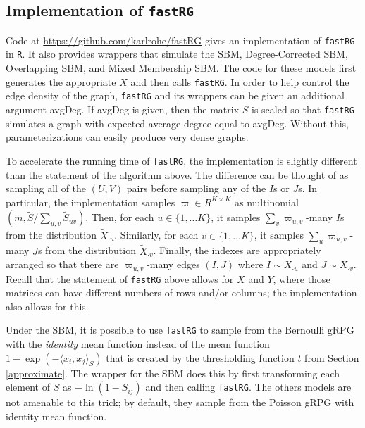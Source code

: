 \documentclass[twoside,11pt]{article}
\begin{document}
\subsection{Implementation of \texttt{fastRG}}\label{sec:implementation}



Code at \url{https://github.com/karlrohe/fastRG} gives an implementation of \texttt{fastRG} in \texttt{R}.  It also provides wrappers  that simulate the SBM, Degree-Corrected SBM, Overlapping SBM, and Mixed Membership SBM.  
The code for these models first generates the appropriate $X$ and then calls \texttt{fastRG}.    In order to help control the edge density of the graph, \texttt{fastRG} and its wrappers can be given an additional argument avgDeg.  If avgDeg is given, then the matrix $S$ is scaled so that \texttt{fastRG} simulates a graph with expected average degree equal to avgDeg.  Without this, parameterizations can easily produce very dense graphs.  

To accelerate the running time of \texttt{fastRG}, the implementation is slightly different than the statement of the algorithm above.  The difference can be thought of as sampling all of the $(U,V)$ pairs before sampling any of the $I$s or $J$s. In particular, the implementation samples $\varpi \in R^{K \times K}$ as multinomial$(m, \tilde S / \sum_{u,v} \tilde S_{uv})$.  Then, for each $u\in \{1, \dots K\}$, it samples $\sum_v \varpi_{u,v}$-many $I$s from the distribution $\tilde X_{\cdot u}$.  Similarly,   for each $v\in \{1, \dots K\}$, it samples $\sum_u \varpi_{u,v}$-many $J$s from the distribution $\tilde X_{\cdot v}$. Finally, the indexes are appropriately arranged so that there are $\varpi_{u,v}$-many edges $(I,J)$ where $I \sim X_{\cdot u}$ and $J \sim X_{\cdot v}$.  Recall that the statement of \texttt{fastRG} above allows for $X$ and $Y$, where those matrices can have different numbers of rows and/or columns; the implementation also allows for this.  

Under the SBM, it is possible to use \texttt{fastRG} to sample from the Bernoulli gRPG with the \textit{identity} mean function instead of the mean function $1 - \exp(-\langle x_i, x_j \rangle_S)$ that is created by the thresholding  function $t$ from Section \ref{approximate}.  The wrapper for the SBM does this by first transforming each element of $S$ as $-\ln(1-S_{ij})$ and then calling \texttt{fastRG}. The others models are not amenable to this trick; by default, they sample from the Poisson gRPG with identity mean function.  
\end{document}
